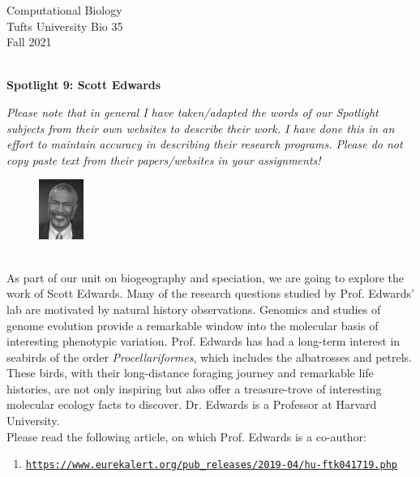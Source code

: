 \documentclass{article}
\begin{document}
\begin{flushright}
Computational Biology ~\\
Tufts University Bio 35 ~\\
Fall 2021 ~\\ ~\\
\end{flushright}
\begin{center}{\textbf{\Large{Spotlight 9: Scott Edwards}}}\end{center}

\textit{Please note that in general I have taken/adapted the words of our Spotlight subjects from their own websites to describe their work. I have done this in an effort to maintain accuracy in describing their research programs. Please do not copy paste text from their papers/websites in your assignments!}

\begin{figure}
\begin{center}
 \includegraphics[width=0.13\textwidth]{images/scott-edwards.jpeg}
 \end{center}
\end{figure}
~\\ As part of our unit on biogeography and speciation, we are going to explore the work of Scott Edwards. Many of the research questions studied by Prof. Edwards' lab are motivated by natural history observations. Genomics and studies of genome evolution provide a remarkable window into the molecular basis of interesting phenotypic variation. Prof. Edwards has had a long-term interest in seabirds of the order \textit{Procellariformes}, which includes the albatrosses and petrels. These birds, with their long-distance foraging journey and remarkable life histories, are not only inspiring but also offer a treasure-trove of interesting molecular ecology facts to discover. Dr. Edwards is a Professor at Harvard University.
~\\

Please read the following article, on which Prof. Edwards is a co-author: 
\begin{enumerate}
\item \texttt{\href{https://www.eurekalert.org/pub_releases/2019-04/hu-ftk041719.php}{https://www.eurekalert.org/pub\_releases/2019-04/hu-ftk041719.php}}
\end{enumerate}
\end{document}
